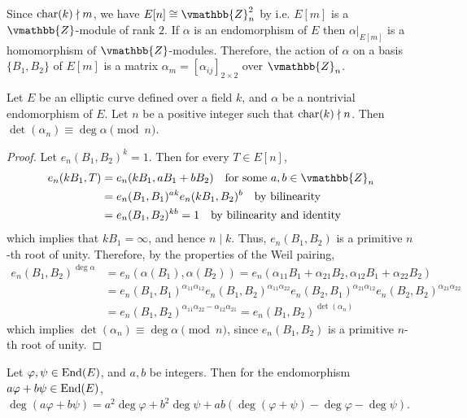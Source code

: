 Since $\operatorname{char}(k) \nmid m$, we have $E[n] \cong \vmathbb{Z}_n^2$ by 
 i.e. $E[m]$ is a $\vmathbb{Z}$-module of rank $2$. If $\alpha$ 
is an endomorphism of $E$ then $\alpha\vert_{E[m]}$ is a homomorphism of $\vmathbb{Z}$-modules. 
Therefore, the action of $\alpha$ on a basis $\{B_1, B_2\}$ of $E[m]$ is a matrix $\alpha_m = 
[\alpha_{ij}]_{2 \times 2}$ over $\vmathbb{Z}_n$.
\begin{theorem}
\label{theorem:endo-deg-det}
Let $E$ be an elliptic curve defined over a field $k$, and $\alpha$ be a nontrivial endomorphism of 
$E$. Let $n$ be a positive integer such that $\operatorname{char}(k) \nmid n$. Then $\det(\alpha_n) \equiv 
\deg \alpha \pmod n$.
\end{theorem}
\begin{proof}
Let $e_n(B_1, B_2)^k = 1$. Then for every $T \in E[n]$,
\begin{align*}
e_n(kB_1, T) 
&= e_n(kB_1, aB_1 + bB_2) \quad \text{for some } a, b \in \vmathbb{Z}_n \\ 
&= e_n(B_1, B_1)^{ak}e_n(kB_1, B_2)^b \quad \text{by bilinearity}\\
&= e_n(B_1, B_2)^{kb} = 1 \quad \text{by bilinearity and identity}
\end{align*}
which implies that $kB_1 = \infty$, and hence $n \mid k$. Thus, $e_n(B_1, B_2)$ is a primitive 
$n$-th root of unity. Therefore, by the properties of the Weil pairing, 
\begin{align*}
e_n(B_1, B_2)^{\deg \alpha} 
&= e_n(\alpha(B_1), \alpha(B_2)) = e_n(\alpha_{11}B_1 + \alpha_{21}B_2, \alpha_{12}B_1 + 
\alpha_{22}B_2) \\
&= e_n(B_1, B_1)^{\alpha_{11}\alpha_{12}}e_n(B_1, B_2)^{\alpha_{11}\alpha_{22}}e_n(B_2, 
B_1)^{\alpha_{21}\alpha_{12}}e_n(B_2, B_2)^{\alpha_{21}\alpha_{22}} \\
&= e_n(B_1, B_2)^{\alpha_{11}\alpha_{22} - \alpha_{12}\alpha_{21}} = e_n(B_1, B_2)^{\det(\alpha_n)}
\end{align*}
which implies $\det(\alpha_n) \equiv \deg \alpha \pmod n$, since $e_n(B_1, B_2)$ is a primitive 
$n$-th root of unity.
\end{proof}
\begin{corollary}
\label{corollary:homo-lin-deg}
Let $\varphi, \psi \in \operatorname{End}(E)$, and $a, b$ be integers. Then for the endomorphism $a\varphi + 
b\psi \in \operatorname{End}(E)$, $\deg(a\varphi + b\psi) = a^2\deg \varphi + b^2\deg \psi + ab(\deg(\varphi 
+ \psi) - \deg\varphi - \deg\psi)$.
\end{corollary}

